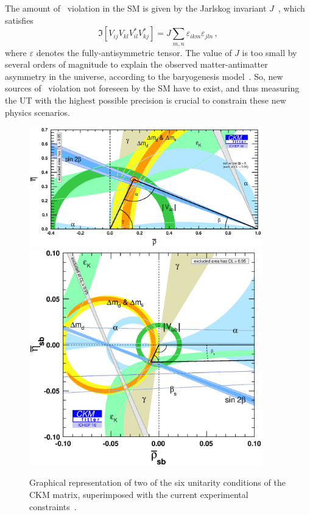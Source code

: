 The amount of \CP~violation in the SM is given by the Jarlskog invariant $J$~\cite{Jarlskog:1985ht}, which satisfies
\begin{equation}
  \Im\left[V_{ij}V_{kl}V^{*}_{il}V^{*}_{kj}\right] = J \sum\limits_{m,n}\varepsilon_{ikm}\varepsilon_{jln}\,,
\end{equation}
where $\varepsilon$ denotes the fully-antisymmetric tensor. The value of $J$ is too small by several orders of magnitude to explain the observed matter-antimatter asymmetry in the universe, according to the baryogenesis model~\cite{Sakharov:1967dj}. So, new sources of \CP~violation not foreseen by the SM have to exist, and thus measuring the UT with the highest possible precision is crucial to constrain these new physics scenarios.

\begin{figure}[htbp]
  \begin{center}
    \includegraphics[width=0.9\textwidth]{02CKM/figs/ut.eps} \\
    \includegraphics[width=0.9\textwidth]{02CKM/figs/ut_s.eps} \\
  \end{center}
  \vspace{-2mm}
  \caption{Graphical representation of two of the six unitarity conditions of the CKM matrix, superimposed with the current experimental constraints~\cite{CKMfitter2015}.}
  \label{fig:ut}
\end{figure}
